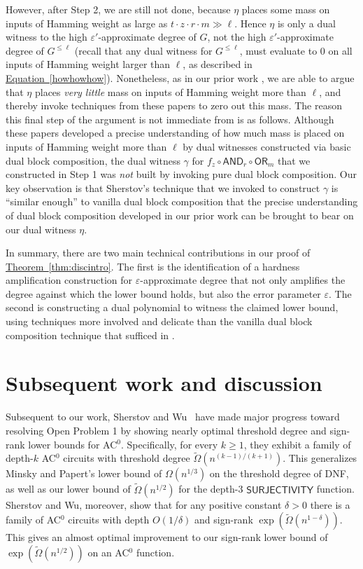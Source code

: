 \documentclass[11pt]{article}
\numberwithin{equation}{section}
\theoremstyle{definition}
\theoremstyle{plain}
\newcommand{\expref}[2]{\hyperref[#2]{#1~\ref{#2}}}
\newcommand{\expeqref}[2]{\hyperref[#2]{#1~\eqref{#2}}}
\newcommand{\OR}{\mathsf{ OR}}
\newcommand{\eps}{\varepsilon}
\newcommand{\AND}{\mathsf{AND}}
\begin{document}
However, after Step 2, we are still not done, because $\eta$ places some mass on
inputs of Hamming weight as large as $t \cdot z \cdot r \cdot m \gg \ell$. Hence $\eta$ is only a dual
witness to the high $\eps'$-approximate degree of $G$, not the high $\eps'$-approximate degree of $G^{\leq \ell}$ (recall that any
dual witness %
for $G^{\leq \ell}$, must evaluate to 0 on all inputs of Hamming weight larger than $\ell$, %
as described in %
\expeqref{Equation}{howhowhow}). 
Nonetheless, as in our prior work \cite{adegsurj, bkt}, we are able to argue that $\eta$ places \emph{very little} mass on inputs of Hamming weight more than
$\ell$, and thereby invoke techniques from %
these papers %
to zero out this mass. 
The reason this final step of the argument is not immediate
from %
\cite{adegsurj, bkt} is as follows. Although %
these papers %
developed
a precise understanding of how much mass is placed on inputs of Hamming weight
more than $\ell$ by dual witnesses constructed via basic dual block composition, 
the dual witness $\gamma$ for $f_z \circ \AND_r \circ \OR_{m}$ that we constructed in Step 1 
was \emph{not} built by invoking pure dual block composition. Our key observation is that Sherstov's technique that
we invoked to construct $\gamma$ is ``similar enough'' to vanilla dual block composition that the precise understanding
of dual block composition developed in our prior work can be brought to bear on our dual witness $\eta$.

In summary, there are two main technical contributions in our proof of \expref{Theorem}{thm:discintro}. The first is the identification
of a hardness amplification construction for $\eps$-approximate degree that not only amplifies the degree against
which the lower bound holds, but also the error parameter $\eps$. The second is constructing a dual polynomial
to witness the claimed lower bound, using techniques more involved and delicate than the vanilla dual block composition technique that
sufficed in %
\cite{adegsurj, bkt}.



\vspace{-2mm}
\section{Subsequent work and discussion}

Subsequent to our work, Sherstov and Wu~\cite{SherstovWu19} have made major progress toward resolving Open Problem 1 by showing nearly optimal threshold degree and sign-rank lower bounds for AC$^0$. Specifically, for every $k \ge 1$, they exhibit a family of depth-$k$ AC$^0$ circuits with threshold degree $\tilde{\Omega}(n^{(k-1)/(k+1)})$. This generalizes Minsky and Papert's lower bound of $\Omega(n^{1/3})$ on the threshold degree of DNF, as well as our lower bound of $\tilde{\Omega}(n^{1/2})$ for the depth-3 $\mathsf{SURJECTIVITY}$ function. Sherstov and Wu, moreover, show that for any positive constant $\delta > 0$ there is a family of AC$^0$ circuits with depth $O(1/\delta)$ and sign-rank $\exp\left(\tilde{\Omega}(n^{1-\delta})\right)$. This gives an almost optimal improvement to our sign-rank lower bound of $\exp\left(\tilde{\Omega}(n^{1/2})\right)$ on an AC$^0$ function.
\end{document}
